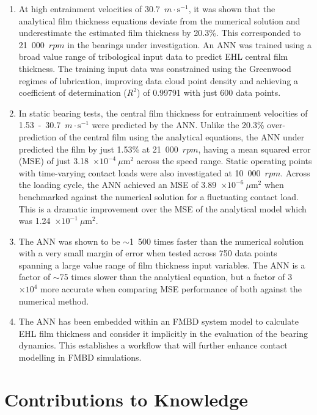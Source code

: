 \begin{enumerate}
	\item At high entrainment velocities of 30.7~$m \cdot \mathrm{s}^{-1}$, it was shown that the analytical film thickness equations deviate from the numerical solution and underestimate the estimated film thickness by 20.3\%. This corresponded to 21~000~$rpm$ in the bearings under investigation. An ANN was trained using a broad value range of tribological input data to predict EHL central film thickness. The training input data was constrained using the Greenwood regimes of lubrication, improving data cloud point density and achieving a coefficient of determination ($R^2$) of 0.99791 with just 600 data points.
	
	\item In static bearing tests, the central film thickness for entrainment velocities of 1.53~-~30.7~$m \cdot \mathrm{s}^{-1}$ were predicted by the ANN. Unlike the 20.3\% over-prediction of the central film using the analytical equations, the ANN under predicted the film by just 1.53\% at 21~000~$rpm$, having a mean squared error (MSE) of just 3.18~$\times 10^{-4}~\mu \mathrm{m}^2$ across the speed range. Static operating points with time-varying contact loads were also investigated at 10~000~$rpm$. Across the loading cycle, the ANN achieved an MSE of 3.89~$\times 10^{-6}~\mu \mathrm{m}^2$ when benchmarked against the numerical solution for a fluctuating contact load. This is a dramatic improvement over the MSE of the analytical model which was 1.24~$\times 10^{-1}~\mu\mathrm{m}^2$.
	
	\item The ANN was shown to be $\sim$1~500 times faster than the numerical solution with a very small margin of error when tested across 750 data points spanning a large value range of film thickness input variables. The ANN is a factor of $\sim$75 times slower than the analytical equation, but a factor of 3~$\times 10^{4}$ more accurate when comparing MSE performance of both against the numerical method.
	
	\item The ANN has been embedded within an FMBD system model to calculate EHL film thickness and consider it implicitly in the evaluation of the bearing dynamics. This establishes a workflow that will further enhance contact modelling in FMBD simulations.
\end{enumerate}


\section{Contributions to Knowledge} \label{Contribution to Knowledge}

